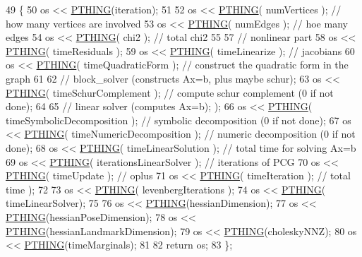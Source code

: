 \begin{DoxyCode}
49   \{
50     os << \hyperlink{batch__stats_8cpp_a4615940f3cf749903bc1c549b2457d26}{PTHING}(iteration);
51 
52     os << \hyperlink{batch__stats_8cpp_a4615940f3cf749903bc1c549b2457d26}{PTHING}( numVertices ); \textcolor{comment}{// how many vertices are involved}
53     os << \hyperlink{batch__stats_8cpp_a4615940f3cf749903bc1c549b2457d26}{PTHING}( numEdges ); \textcolor{comment}{// hoe many edges}
54     os << \hyperlink{batch__stats_8cpp_a4615940f3cf749903bc1c549b2457d26}{PTHING}(  chi2 );  \textcolor{comment}{// total chi2}
55     
57     \textcolor{comment}{// nonlinear part}
58     os << \hyperlink{batch__stats_8cpp_a4615940f3cf749903bc1c549b2457d26}{PTHING}(  timeResiduals );  
59     os << \hyperlink{batch__stats_8cpp_a4615940f3cf749903bc1c549b2457d26}{PTHING}(  timeLinearize );   \textcolor{comment}{// jacobians}
60     os << \hyperlink{batch__stats_8cpp_a4615940f3cf749903bc1c549b2457d26}{PTHING}(  timeQuadraticForm ); \textcolor{comment}{// construct the quadratic form in the graph}
61     
62     \textcolor{comment}{// block\_solver (constructs Ax=b, plus maybe schur);}
63     os << \hyperlink{batch__stats_8cpp_a4615940f3cf749903bc1c549b2457d26}{PTHING}(  timeSchurComplement ); \textcolor{comment}{// compute schur complement (0 if not done);}
64     
65     \textcolor{comment}{// linear solver (computes Ax=b); );}
66     os << \hyperlink{batch__stats_8cpp_a4615940f3cf749903bc1c549b2457d26}{PTHING}(  timeSymbolicDecomposition ); \textcolor{comment}{// symbolic decomposition (0 if not done);}
67     os << \hyperlink{batch__stats_8cpp_a4615940f3cf749903bc1c549b2457d26}{PTHING}(  timeNumericDecomposition ); \textcolor{comment}{// numeric decomposition  (0 if not done);}
68     os << \hyperlink{batch__stats_8cpp_a4615940f3cf749903bc1c549b2457d26}{PTHING}(  timeLinearSolution );             \textcolor{comment}{// total time for solving Ax=b}
69     os << \hyperlink{batch__stats_8cpp_a4615940f3cf749903bc1c549b2457d26}{PTHING}(  iterationsLinearSolver );  \textcolor{comment}{// iterations of PCG}
70     os << \hyperlink{batch__stats_8cpp_a4615940f3cf749903bc1c549b2457d26}{PTHING}(  timeUpdate ); \textcolor{comment}{// oplus}
71     os << \hyperlink{batch__stats_8cpp_a4615940f3cf749903bc1c549b2457d26}{PTHING}(  timeIteration ); \textcolor{comment}{// total time );}
72 
73     os << \hyperlink{batch__stats_8cpp_a4615940f3cf749903bc1c549b2457d26}{PTHING}( levenbergIterations );
74     os << \hyperlink{batch__stats_8cpp_a4615940f3cf749903bc1c549b2457d26}{PTHING}( timeLinearSolver);
75 
76     os << \hyperlink{batch__stats_8cpp_a4615940f3cf749903bc1c549b2457d26}{PTHING}(hessianDimension);
77     os << \hyperlink{batch__stats_8cpp_a4615940f3cf749903bc1c549b2457d26}{PTHING}(hessianPoseDimension);
78     os << \hyperlink{batch__stats_8cpp_a4615940f3cf749903bc1c549b2457d26}{PTHING}(hessianLandmarkDimension);
79     os << \hyperlink{batch__stats_8cpp_a4615940f3cf749903bc1c549b2457d26}{PTHING}(choleskyNNZ);
80     os << \hyperlink{batch__stats_8cpp_a4615940f3cf749903bc1c549b2457d26}{PTHING}(timeMarginals);
81 
82     \textcolor{keywordflow}{return} os;
83   \};
\end{DoxyCode}
